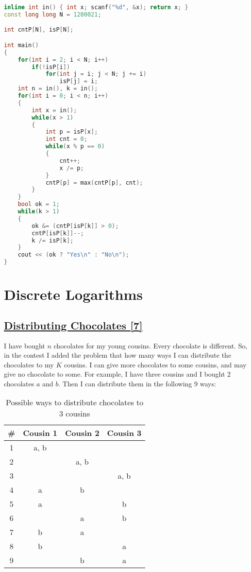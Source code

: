 \documentclass[10pt,a4paper]{article}
\begin{document}
\begin{itemize}
\begin{lstlisting}[language=C++, caption={Remainders Game}, label={1st:code}, mathescape=true, breaklines=true]
inline int in() { int x; scanf("%d", &x); return x; }
const long long N = 1200021;

int cntP[N], isP[N];

int main()
{
	for(int i = 2; i < N; i++)
		if(!isP[i])
			for(int j = i; j < N; j += i)
				isP[j] = i;
	int n = in(), k = in();
	for(int i = 0; i < n; i++)
	{
		int x = in();
		while(x > 1)
		{
			int p = isP[x];
			int cnt = 0;
			while(x % p == 0)
			{
				cnt++;
				x /= p;
			}
			cntP[p] = max(cntP[p], cnt);
		}
	}
	bool ok = 1;
	while(k > 1)
	{
		ok &= (cntP[isP[k]] > 0);
		cntP[isP[k]]--;
		k /= isP[k];
	}
	cout << (ok ? "Yes\n" : "No\n");
}
\end{lstlisting}

\section{Discrete Logarithms}
\subsection*{\href{https://lightoj.com/problem/distributing-chocolates}{\underline{Distributing Chocolates [7]}}}

I have bought $n$ chocolates for my young cousins. Every chocolate is different. So, in the contest I added the problem that how many ways I can distribute the chocolates to my $K$ cousins. I can give more chocolates to some cousins, and may give no chocolate to some. For example, I have three cousins and I bought 2 chocolates $a$ and $b$. Then I can distribute them in the following 9 ways:


\begin{table}[h!]
\centering
\begin{tabular}{|c|c|c|c|}
\hline
\# & Cousin 1 & Cousin 2 & Cousin 3 \\
\hline
1 & a, b &  &  \\
2 &  & a, b &  \\
3 &  &  & a, b \\
4 & a & b &  \\
5 & a &  & b \\
6 &  & a & b \\
7 & b & a &  \\
8 & b &  & a \\
9 &  & b & a \\
\hline
\end{tabular}
\caption{Possible ways to distribute chocolates to 3 cousins}
\end{table}




\end{itemize}
\end{document}
